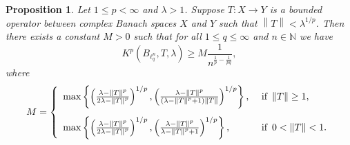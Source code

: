 \documentclass[10pt,a4paper]{amsart}
\newtheorem{prop}{Proposition}
\newcommand{\norm}[1]{\left\lVert#1\right\rVert}
\begin{document}
 \begin{prop}\label{Pal-Vasu-P5-prop-01}
 	Let $1\leq p<\infty$ and $\lambda >1$. Suppose $T:X\rightarrow Y$ is a bounded operator between complex Banach spaces $X$ and $Y$ such that $\norm{T}<\lambda^{1/p}$. Then there exists a constant $M>0$ such that for all $1\leq q\leq \infty$ and $n\in \mathbb{N}$ we have 
 	\begin{equation*}
 		K^p(B_{\ell^n_q},T,\lambda)\geq M \frac{1}{n^{\frac{1}{p}-\frac{1}{pq}}},
 	\end{equation*}
 	where 
 	$$
 	M=\left\{\begin{array}{ll}
 		\max \left\{\left(\frac{\lambda-\norm{T}^{p}}{2\lambda-\norm{T}^p}\right)^{1/p}, \left(\frac{\lambda-\norm{T}^p}{(\lambda-\norm{T}^p+1)\norm{T}}\right)^{1/p}\right\}, & \mbox{ if  \,$\norm{T}\geq 1$},\\[5mm] 
 		\max \left\{\left(\frac{\lambda-\norm{T}^{p}}{2\lambda-\norm{T}^p}\right)^{1/p}, \left(\frac{\lambda-\norm{T}^p}{\lambda-\norm{T}^p+1}\right)^{1/p}\right\}, & \mbox{ if \,$0<\norm{T}<1$}.
 	\end{array}\right.
 	$$
 \end{prop}
\end{document}
